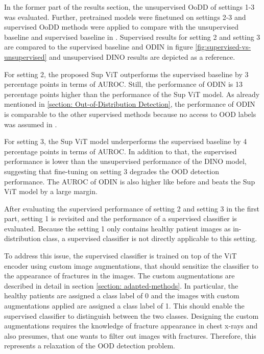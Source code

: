 In the former part of the results section, the unsupervised OoDD of settings 1-3 was evaluated.
Further, pretrained models were finetuned on settings 2-3 and supervised OoDD methods were applied to compare with the unsupervised baseline and supervised baseline in \citep{Berger2021}.
Supervised results for setting 2 and setting 3 are compared to the supervised baseline and ODIN in figure \ref{fig:supervised-vs-unsupervised} and unsupervised DINO results are depicted as a reference.
\par
For setting 2, the proposed Sup ViT outperforms the supervised baseline by 3 percentage points in terms of AUROC.
Still, the performance of ODIN is 13 percentage points higher than the performance of the Sup ViT model.
As already mentioned in \ref{section: Out-of-Distribution Detection}, the performance of ODIN is comparable to the other supervised methods because no access to OOD labels was assumed in \citep{Berger2021}.
\par
For setting 3, the Sup ViT model underperforms the supervised baseline by 4 percentage points in terms of AUROC.
In addition to that, the supervised performance is lower than the unsupervised performance of the DINO model, suggesting that fine-tuning on setting 3 degrades the OOD detection performance.
The AUROC of ODIN is also higher like before and beats the Sup ViT model by a large margin.
\par
After evaluating the supervised performance of setting 2 and setting 3 in the first part, setting 1 is revisited and the performance of a supervised classifier is evaluated.
Because the setting 1 only contains healthy patient images as in-distribution class, a supervised classifier is not directly applicable to this setting.
\par
To address this issue, the supervised classifier is trained on top of the ViT encoder using custom image augmentations, that should sensitize the classifier to the appearance of fractures in the images.
The custom augmentations are described in detail in section \ref{section: adapted-methods}.
In particular, the healthy patients are assigned a class label of 0 and the images with custom augmentations applied are assigned a class label of 1.
This should enable the supervised classifier to distinguish between the two classes.
Designing the custom augmentations requires the knowledge of fracture appearance in chest x-rays and also presumes, that one wants to filter out images with fractures.
Therefore, this represents a relaxation of the OOD detection problem.

